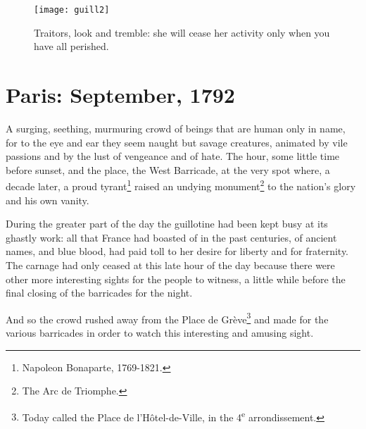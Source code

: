 \documentclass[paper=5.5in:8.5in,BCOR=7mm,twoside,DIV=calc,12pt,usegeometry,chapterprefix,endperiod,headings=big]{scrbook}
\newcommand{\moderatelyhuge}{\fontsize{50}{60}\selectfont}
\renewcommand*{\chaptermarkformat}{}
\renewcommand*{\chaptermarkformat}{%

\chapapp~\thechapter\autodot\enskip}
\begin{document}

\renewcommand*{\chapterpagestyle}{empty}


\tableofcontents
\thispagestyle{empty}
\clearpage

\vfill
\begin{figure}[p!]
\centering
\texttt{[image: guill2]}
\caption{Traitors, look and tremble: she will cease her activity only when you have all perished.}
\label{guillotine}
\end{figure}
\vfill
\thispagestyle{empty}
\clearpage


\pagestyle{headings}
\renewcommand*{\chapterpagestyle}{plain}


\renewcommand*{\chaptermarkformat}{}

\chapter{Paris: September, 1792}
\lettrine[lines=4]{A}{} surging, seething, murmuring crowd of beings that are human only in name, for to the eye and ear they seem naught but savage creatures, animated by vile passions and by the lust of vengeance and of hate. The hour, some little time before sunset, and the place, the West Barricade, at the very spot where, a decade later, a proud tyrant\footnote{Napoleon Bonaparte, 1769-1821.} raised an undying monument\footnote{The Arc de Triomphe.} to the nation's glory and his own vanity.

During the greater part of the day the guillotine had been kept busy at its ghastly work: all that France had boasted of in the past centuries, of ancient names, and blue blood, had paid toll to her desire for liberty and for fraternity. The carnage had only ceased at this late hour of the day because there were other more interesting sights for the people to witness, a little while before the final closing of the barricades for the night.

And so the crowd rushed away from the Place de Grève\footnote{Today called the Place de l'Hôtel-de-Ville, in the 4\textsuperscript{e} arrondissement.} and made for the various barricades in order to watch this interesting and amusing sight.
\end{document}
